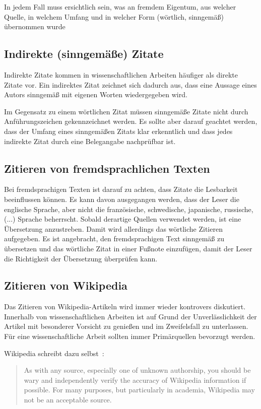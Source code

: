 In jedem Fall muss ersichtlich sein, was an fremdem Eigentum, aus welcher Quelle, in welchem Umfang und in welcher Form (wörtlich, sinngemäß) übernommen wurde

\subsection{Indirekte (sinngemäße) Zitate}\label{sec:citations:indirect}
%
Indirekte Zitate kommen in wissenschaftlichen Arbeiten häufiger als direkte Zitate vor. Ein indirektes Zitat zeichnet sich dadurch aus, dass eine Aussage eines Autors sinngemäß mit eigenen Worten wiedergegeben wird.

Im Gegensatz zu einem wörtlichen Zitat müssen sinngemäße Zitate nicht durch Anführungszeichen gekennzeichnet werden. Es sollte aber darauf geachtet werden, dass der Umfang eines sinngemäßen Zitats klar erkenntlich und dass jedes indirekte Zitat durch eine Belegangabe nachprüfbar ist.

\subsection{Zitieren von fremdsprachlichen Texten}\label{sec:citations:forgein_languages}
%
Bei fremdsprachigen Texten ist darauf zu achten, dass Zitate die Lesbarkeit beeinflussen können. Es kann davon ausgegangen werden, dass der Leser die englische Sprache, aber nicht die französische, schwedische, japanische, russische, (...) Sprache beherrscht. Sobald derartige Quellen verwendet werden, ist eine Übersetzung anzustreben. Damit wird allerdings das wörtliche Zitieren aufgegeben. Es ist angebracht, den fremdsprachigen Text sinngemäß zu übersetzen und das wörtliche Zitat in einer Fußnote einzufügen, damit der Leser die Richtigkeit der Übersetzung überprüfen kann.

\subsection{Zitieren von Wikipedia}\label{sec:citations:wikipedia}
%
Das Zitieren von Wikipedia-Artikeln wird immer wieder kontrovers diskutiert. Innerhalb von wissenschaftlichen Arbeiten ist auf Grund der Unverlässlichkeit der Artikel mit besonderer Vorsicht zu genießen und im Zweifelsfall zu unterlassen. Für eine wissenschaftliche Arbeit sollten immer Primärquellen bevorzugt werden.

Wikipedia schreibt dazu selbst~\cite{wikipedia:citing}:

\begin{quote}
  \glqq As with any source, especially one of unknown authorship, you should be wary and independently verify the accuracy of Wikipedia information if possible. For many purposes, but particularly in academia, Wikipedia may not be an acceptable source.\grqq{}
\end{quote}


